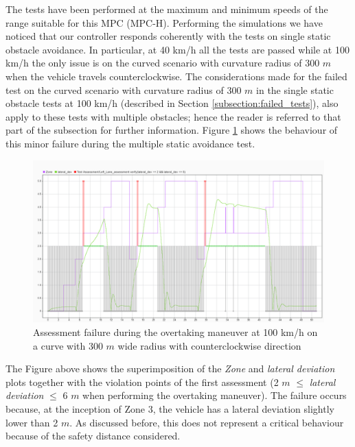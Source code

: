 The tests have been performed at the maximum and minimum speeds of the range suitable for this MPC (MPC-H). Performing the simulations we have noticed that our controller responds coherently with the tests on single static obstacle avoidance. In particular, at 40 km/h all the tests are passed while at 100 km/h the only issue is on the curved scenario with curvature radius of 300 $m$ when the vehicle travels counterclockwise.
The considerations made for the failed test on the curved scenario with curvature radius of 300 $m$ in the single static obstacle tests at 100 km/h (described in Section \ref{subsection:failed_tests}), also apply to these tests with multiple obstacles; hence the reader is referred to that part of the subsection for further information. Figure \ref{fig:fail} shows the behaviour of this minor failure during the multiple static avoidance test.
\begin{figure}[H]
    \centering
    \includegraphics[width=1\textwidth,keepaspectratio]{Figures/failed.png}
    \caption{Assessment failure during the overtaking maneuver at 100 km/h on a curve with 300 $m$ wide radius with counterclockwise direction }
    \label{fig:fail}
\end{figure}
The Figure above shows the superimposition of the \textit{Zone} and \textit{lateral deviation} plots together with the violation points of the first assessment (2 $m$ $\leq$ \textit{lateral deviation} $\leq$ 6 $m$ when performing the overtaking maneuver).
The failure occurs because, at the inception of Zone 3, the vehicle has a lateral deviation slightly lower than 2 $m$. As discussed before, this does not represent a critical behaviour because of the safety distance considered.
